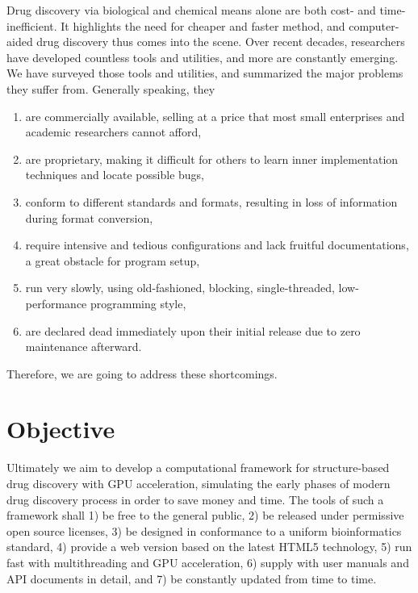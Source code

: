 Drug discovery via biological and chemical means alone are both cost- and time-inefficient. It highlights the need for cheaper and faster method, and computer-aided drug discovery thus comes into the scene. Over recent decades, researchers have developed countless tools and utilities, and more are constantly emerging. We have surveyed those tools and utilities, and summarized the major problems they suffer from. Generally speaking, they
\begin{enumerate}
\item are commercially available, selling at a price that most small enterprises and academic researchers cannot afford,
\item are proprietary, making it difficult for others to learn inner implementation techniques and locate possible bugs,
\item conform to different standards and formats, resulting in loss of information during format conversion,
\item require intensive and tedious configurations and lack fruitful documentations, a great obstacle for program setup,
\item run very slowly, using old-fashioned, blocking, single-threaded, low-performance programming style,
\item are declared dead immediately upon their initial release due to zero maintenance afterward.
\end{enumerate}
Therefore, we are going to address these shortcomings.

\section{Objective}

Ultimately we aim to develop a computational framework for structure-based drug discovery with GPU acceleration, simulating the early phases of modern drug discovery process in order to save money and time. The tools of such a framework shall 1) be free to the general public, 2) be released under permissive open source licenses, 3) be designed in conformance to a uniform bioinformatics standard, 4) provide a web version based on the latest HTML5 technology, 5) run fast with multithreading and GPU acceleration, 6) supply with user manuals and API documents in detail, and 7) be constantly updated from time to time.

